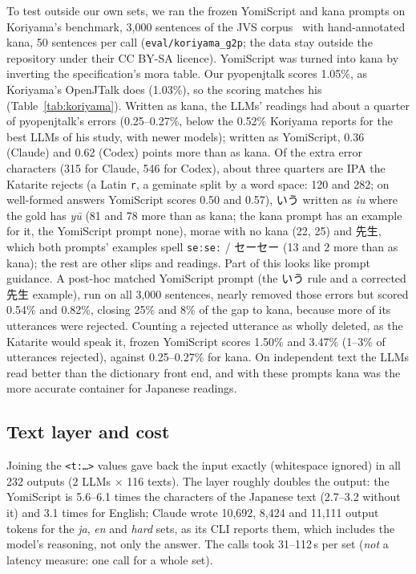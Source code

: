 \documentclass[11pt,a4paper]{article}
\newcommand{\ys}[1]{\mbox{\texttt{#1}}}
\begin{document}
To test outside our own sets, we ran the frozen YomiScript and kana prompts on Koriyama's benchmark, 3{,}000 sentences
of the JVS corpus~\citep{takamichi2020jvs} with hand-annotated kana, 50 sentences per call
(\texttt{eval/koriyama\_g2p}; the data stay outside the repository under their CC BY-SA licence). YomiScript was
turned into kana by inverting the specification's mora table. Our pyopenjtalk scores 1.05\%, as Koriyama's OpenJTalk
does (1.03\%), so the scoring matches his (Table~\ref{tab:koriyama}). Written as kana, the LLMs' readings had about a
quarter of pyopenjtalk's errors (0.25--0.27\%, below the 0.52\% Koriyama reports for the best LLMs of his study, with
newer models); written as YomiScript, 0.36 (Claude) and 0.62 (Codex) points more than as kana. Of the extra
error characters (315 for Claude, 546 for Codex), about three quarters are IPA the Katarite rejects (a Latin \ys{r},
a geminate split by a word space: 120 and 282; on well-formed answers YomiScript scores 0.50 and 0.57), いう written
as \emph{iu} where the gold has \emph{yū} (81 and 78 more than as kana; the kana prompt has an example for it, the
YomiScript prompt none), morae with no kana (22, 25) and 先生, which both prompts' examples spell
\ys{seːseː} / セーセー (13 and 2 more than as kana); the rest are other slips and readings. Part of this looks like prompt guidance. A post-hoc matched YomiScript prompt (the いう rule and a corrected 先生 example), run on all 3{,}000 sentences, nearly
removed those errors but scored 0.54\% and 0.82\%, closing 25\% and 8\% of the gap to kana, because more of its
utterances were rejected. Counting a rejected utterance as wholly deleted, as the Katarite would speak it, frozen
YomiScript scores 1.50\% and 3.47\% (1--3\% of utterances rejected), against 0.25--0.27\% for kana. On independent text the LLMs read better than the dictionary front end, and with these prompts
kana was the more accurate container for Japanese readings.

\subsection{Text layer and cost}

Joining the \ys{<t:…>} values gave back the input exactly (whitespace ignored) in all 232 outputs (2 LLMs $\times$ 116
texts). The layer roughly doubles the output: the YomiScript is 5.6--6.1 times the characters of the Japanese text
(2.7--3.2 without it) and 3.1 times for English; Claude wrote 10{,}692, 8{,}424 and 11{,}111 output tokens for the
\emph{ja}, \emph{en} and \emph{hard} sets, as its CLI reports them, which includes the model's reasoning, not only
the answer. The calls took 31--112\,s per set (\emph{not} a latency measure: one call
for a whole set).
\end{document}
